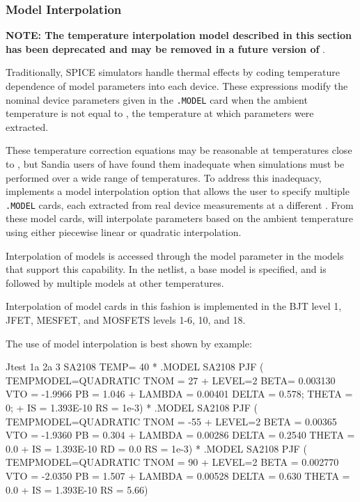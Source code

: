 \subsubsection{Model Interpolation}
\label{Model_Interpolation}

\textbf{NOTE:  The temperature interpolation model described in this section has been deprecated and may be removed in a future version of \Xyce{}}.

Traditionally, SPICE simulators handle thermal effects by coding
temperature dependence of model parameters into each device.  These
expressions modify the nominal device parameters given in
the \texttt{.MODEL} card when the ambient temperature is not equal
to , the temperature at which parameters were extracted.

These temperature correction equations may be reasonable at temperatures close
to , but Sandia users of \Xyce{} have found them inadequate when
simulations must be performed over a wide range of temperatures.  To address
this inadequacy, \Xyce{} implements a model interpolation option that allows
the user to specify multiple \texttt{.MODEL} cards, each extracted from real
device measurements at a different .  From these model cards,
\Xyce{} will interpolate parameters based on the ambient temperature using
either piecewise linear or quadratic interpolation.

Interpolation of models is accessed through the model parameter
 in the models that support this capability.  In the
netlist, a base model is specified, and is followed by multiple models at other
temperatures.  

Interpolation of model cards in this fashion is implemented in the BJT level 1,
JFET, MESFET, and MOSFETS levels 1-6, 10, and 18.

The use of model interpolation is best shown by example:

\begin{vquote}
Jtest 1a 2a 3 SA2108 TEMP= 40
*
.MODEL SA2108 PJF ( TEMPMODEL=QUADRATIC TNOM = 27
+ LEVEL=2 BETA= 0.003130 VTO = -1.9966 PB = 1.046
+ LAMBDA = 0.00401 DELTA = 0.578; THETA = 0;
+ IS = 1.393E-10          RS = 1e-3)
*
.MODEL SA2108 PJF ( TEMPMODEL=QUADRATIC TNOM = -55
+ LEVEL=2 BETA = 0.00365 VTO = -1.9360 PB = 0.304
+ LAMBDA = 0.00286 DELTA = 0.2540 THETA = 0.0
+ IS = 1.393E-10 RD = 0.0 RS = 1e-3)
* 
.MODEL SA2108 PJF ( TEMPMODEL=QUADRATIC TNOM = 90
+ LEVEL=2 BETA = 0.002770 VTO = -2.0350 PB = 1.507
+ LAMBDA = 0.00528 DELTA = 0.630 THETA = 0.0
+ IS = 1.393E-10          RS = 5.66)
\end{vquote}

